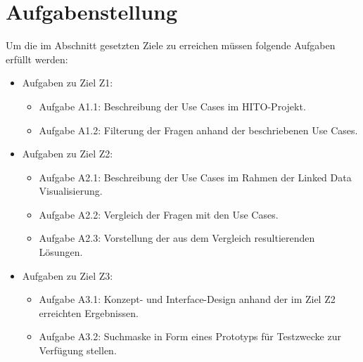 

\section{Aufgabenstellung}\label{sec:aufgabenstellung}

Um die im Abschnitt  gesetzten Ziele zu erreichen müssen folgende Aufgaben erfüllt werden:

\begin{itemize}
\item Aufgaben zu Ziel Z1:
	\begin{itemize}
	\item Aufgabe A1.1: Beschreibung der Use Cases im HITO-Projekt.
	\item Aufgabe A1.2: Filterung der Fragen anhand der beschriebenen Use Cases.
	\end{itemize}
\item Aufgaben zu Ziel Z2:
	\begin{itemize}
	\item Aufgabe A2.1: Beschreibung der Use Cases im Rahmen der Linked Data Visualisierung.
	\item Aufgabe A2.2: Vergleich der Fragen mit den Use Cases.
	\item Aufgabe A2.3: Vorstellung der aus dem Vergleich resultierenden Lösungen.
	\end{itemize}
\item Aufgaben zu Ziel Z3:
	\begin{itemize}
	\item Aufgabe A3.1: Konzept- und Interface-Design anhand der im Ziel Z2 erreichten Ergebnissen.
	\item Aufgabe A3.2: Suchmaske in Form eines Prototyps für Testzwecke zur Verfügung stellen.
	\end{itemize}
\end{itemize}

